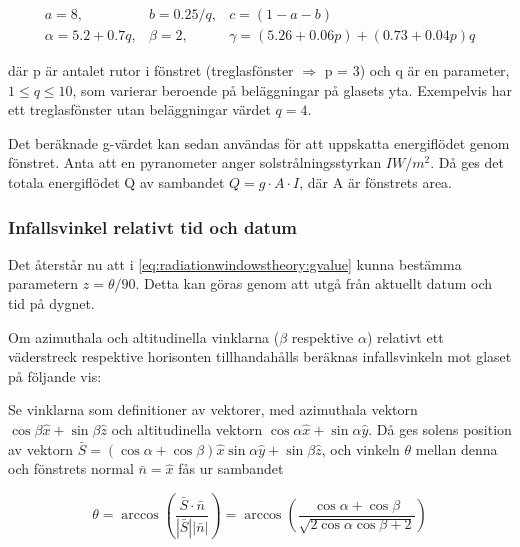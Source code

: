 \begin{eqnarray}
a = 8, & b = 0.25/q, & c = (1-a-b) \nonumber \\
\alpha = 5.2 + 0.7q, & \beta = 2, & \gamma = (5.26+0.06p) + (0.73+0.04p)q
\end{eqnarray}

där p är antalet rutor i fönstret (treglasfönster $\Rightarrow$ p = 3) och q är en parameter, $1 \le q \le 10$, som varierar beroende på beläggningar på glasets yta. Exempelvis har ett treglasfönster utan beläggningar värdet $q=4$.

Det beräknade g-värdet kan sedan användas för att uppskatta energiflödet genom fönstret. Anta att en pyranometer anger solstrålningsstyrkan $\unit{I}{W/m^2}$. Då ges det totala energiflödet Q av sambandet $Q = g \cdot A \cdot I$, där A är fönstrets area.

\subsubsection{Infallsvinkel relativt tid och datum}

Det återstår nu att i \eqref{eq:radiationwindowstheory:gvalue} kunna bestämma parametern $z = \theta/90$. Detta kan göras genom att utgå från aktuellt datum och tid på dygnet.


Om azimuthala och altitudinella vinklarna ($\beta$ respektive $\alpha$) relativt ett väderstreck respektive horisonten tillhandahålls beräknas infallsvinkeln mot glaset på följande vis:

Se vinklarna som definitioner av vektorer, med azimuthala vektorn $\cos{\beta}\hat{x}+\sin{\beta}\hat{z}$ och altitudinella vektorn $\cos{\alpha}\hat{x}+\sin{\alpha}\hat{y}$. Då ges solens position av vektorn $\bar{S} = \left(\cos{\alpha} + \cos{\beta} \right) \hat{x} \sin{\alpha}\hat{y} + \sin{\beta}\hat{z}$, och vinkeln $\theta$ mellan denna och fönstrets normal $\bar{n} = \hat{x}$ fås ur sambandet

\begin{equation} 
\theta = \arccos{\left(\frac{\bar{S}\cdot\bar{n}}{|\bar{S}||\bar{n}|}\right)} = \arccos{\left(\frac{\cos{\alpha} + \cos{\beta}}{\sqrt{2\cos{\alpha}\cos{\beta} + 2}}\right)}
\end{equation}

\begin{comment}
Simmler & Binder
Experimental and numerical determination of the total solar energy transmittance of glazing with venetian blind shading
\end{comment}


\begin{comment}
I diskussion:
- Hur kan man koppla detta till värmesystemet?
	- Registrera intensitet, tid på dygnet och datum
	- Beräkna ungefärlig tillförd effekt
	- Kompensera genom att säga till värmesystemet att minska/stänga inflödet
- Blir det lättare att helt enkelt mäta temperaturen i rummet och helt enkelt gå utifrån det? Vad är mer kostnadseffektivt?
\end{comment}
